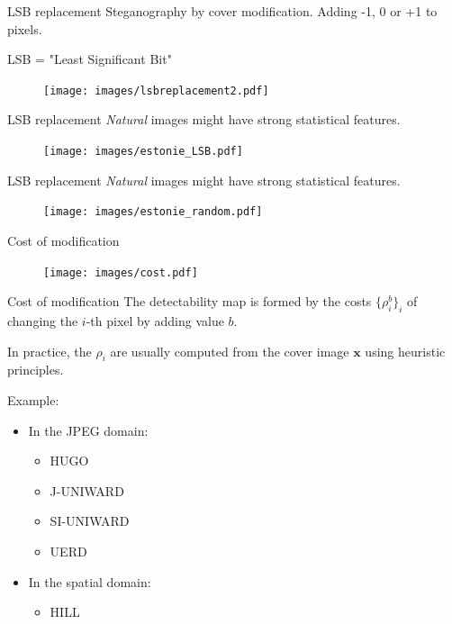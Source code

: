 \documentclass[10pt]{beamer}
\begin{document}
\begin{frame}{LSB replacement}
Steganography by cover modification. Adding -1, 0 or +1 to pixels.

\alert{LSB} = "\alert{L}east \alert{S}ignificant \alert{B}it"
\begin{figure}[h]
\texttt{[image: images/lsbreplacement2.pdf]}
\end{figure}
\end{frame}

\begin{frame}{LSB replacement}
\textit{Natural} images might have strong \alert{statistical features}.
\begin{figure}[h]
\texttt{[image: images/estonie\_LSB.pdf]}
\end{figure}
\end{frame}

\begin{frame}{LSB replacement}
\textit{Natural} images might have strong \alert{statistical features}.
\begin{figure}[h]
\texttt{[image: images/estonie\_random.pdf]}
\end{figure}
\end{frame}

\begin{frame}{Cost of modification}
\begin{figure}[h]
\texttt{[image: images/cost.pdf]}
\end{figure}
\end{frame}

\begin{frame}{Cost of modification}
The detectability map is formed by the costs \alert{$\{\rho_i^b\}_i$} of changing the $i$-th pixel by adding value $b$.

In practice, the $\rho_i$ are usually computed from the cover image $\mathbf{x}$ using \alert{heuristic principles}.

Example:
\begin{itemize}
    \item In the JPEG domain:
        \begin{itemize}
            \item HUGO~\cite{hugo}
            \item J-UNIWARD~\cite{juni}
            \item SI-UNIWARD~\cite{juni}
            \item UERD~\cite{uerd}
        \end{itemize}
    \item In the spatial domain:
        \begin{itemize}
            \item HILL~\cite{hill}
        \end{itemize}
\end{itemize}

\end{frame}
\end{document}

